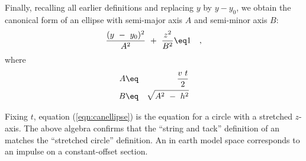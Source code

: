 Finally, recalling all earlier definitions and replacing $y$ by $y-y_0$, we
obtain the canonical form of an ellipse with semi-major axis $A$ and 
semi-minor axis $B$:
\begin{equation}
{(y\ -\ y_0)^2 \over A^2} \ +\ {z^2 \over B^2} \eq 1 \ \ \ ,
\label{eqn:canellipse}
\end{equation}
where
\begin{eqnarray}
 A &\eq& {v\ t \over 2}    \\
 B &\eq& \sqrt{A^2\ -\ h^2}
\end{eqnarray}
\par
Fixing $t$, equation (\ref{eqn:canellipse}) is the equation for a circle with
a stretched $z$-axis.
The above algebra confirms that the
``string and tack'' definition of an 
matches the ``stretched circle'' definition.
An  in earth model space corresponds
to an impulse on a constant-offset section.

